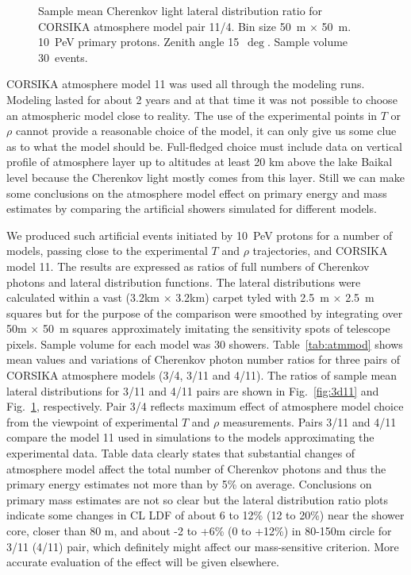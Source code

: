 \documentclass[final,5p,times,twocolumn]{elsarticle}
\begin{document}
\begin{figure}[tb]
\begin{minipage}[t]{0.48\textwidth}
    \vspace{-1.0pc}
    \caption{Sample mean Cherenkov light lateral distribution ratio for CORSIKA atmosphere model
    pair 11/4. Bin size 50~m $\times$ 50~m. 10~PeV primary protons. Zenith angle 15~$\deg$. Sample volume 30~events.}
\label{fig:4d11}
\end{minipage}
\end{figure}


CORSIKA atmosphere model 11 was used all through the modeling runs. Modeling lasted for about 2 years and at that time it was not possible to choose an atmospheric model close to reality. The use of the experimental points in $T$ or $\rho$ cannot provide a reasonable  choice of the model, it can only give us some clue as to what the model should be. Full-fledged choice must include data on vertical profile of atmosphere layer up to altitudes at least 20 km above the lake Baikal level because the Cherenkov light mostly comes from this layer. Still we can make some conclusions on the atmosphere model effect on primary energy and mass estimates by comparing the artificial showers simulated for different models.

We produced such artificial events initiated by 10~PeV protons for a number of models,  passing close to the experimental $T$ and $\rho$ trajectories, and CORSIKA model 11. The results are expressed as ratios of full numbers of Cherenkov photons and lateral distribution functions.
The lateral distributions were calculated within a vast (3.2km $\times$ 3.2km) carpet tyled with 2.5~m $\times$ 2.5~m squares but for the purpose of the comparison were smoothed by integrating over 50m $\times$ 50~m squares approximately imitating the sensitivity spots of telescope pixels.
Sample volume for each model was 30 showers. Table~\ref{tab:atmmod} shows mean values and variations of Cherenkov photon number ratios for three pairs of CORSIKA atmosphere models (3/4, 3/11 and 4/11). The ratios of sample mean lateral distributions for 3/11 and 4/11 pairs are shown in Fig.~\ref{fig:3d11} and Fig.~\ref{fig:4d11}, respectively. Pair 3/4 reflects maximum effect of atmosphere model choice from the viewpoint of experimental $T$ and $\rho$ measurements. Pairs 3/11 and 4/11 compare the model 11 used in simulations to the models approximating the experimental data.
Table data clearly states that substantial changes of atmosphere model affect the total number of Cherenkov photons and thus the primary energy estimates not more than by 5\% on average. Conclusions on primary mass estimates are not so clear but the lateral distribution ratio plots indicate some changes in CL LDF of about 6 to 12\% (12 to 20\%) near the shower core, closer than 80 m, and about -2 to +6\% (0 to +12\%) in 80-150m circle for 3/11 (4/11) pair, which definitely might affect our mass-sensitive criterion. More accurate evaluation of the effect will be given elsewhere.
\end{document}

